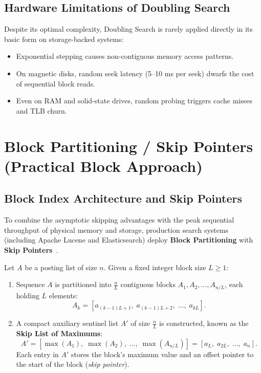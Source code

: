 \subsection{Hardware Limitations of Doubling Search}
Despite its optimal complexity, Doubling Search is rarely applied directly in its basic form on storage-backed systems:
\begin{itemize}
  \item Exponential stepping causes non-contiguous memory access patterns.
  \item On magnetic disks, random seek latency (5--10 ms per seek) dwarfs the cost of sequential block reads.
  \item Even on RAM and solid-state drives, random probing triggers cache misses and TLB churn.
\end{itemize}

\FloatBarrier
\section{Block Partitioning / Skip Pointers (Practical Block Approach)}
\label{sec:block-partitioning-en}

\subsection{Block Index Architecture and Skip Pointers}
To combine the asymptotic skipping advantages with the peak sequential throughput of physical memory and storage, production search systems (including Apache Lucene and Elasticsearch) deploy \textbf{Block Partitioning} with \textbf{Skip Pointers}~\cite{moffat1996,manning2008}.

\begin{definition}
Let $A$ be a posting list of size $n$. Given a fixed integer block size $L \ge 1$:
\begin{enumerate}
  \item Sequence $A$ is partitioned into $\frac{n}{L}$ contiguous blocks $A_1, A_2, \dots, A_{n/L}$, each holding $L$ elements:
  \begin{equation}
    A_k = [a_{(k-1)L + 1}, \; a_{(k-1)L + 2}, \; \dots, \; a_{kL}].
  \end{equation}
  \item A compact auxiliary sentinel list $A'$ of size $\frac{n}{L}$ is constructed, known as the \textbf{Skip List of Maximums}:
  \begin{equation}
    A' = \left[\max(A_1), \; \max(A_2), \; \dots, \; \max(A_{n/L})\right] = \left[a_L, \; a_{2L}, \; \dots, \; a_n\right].
  \end{equation}
  Each entry in $A'$ stores the block's maximum value and an offset pointer to the start of the block (\textit{skip pointer}).
\end{enumerate}
\end{definition}

